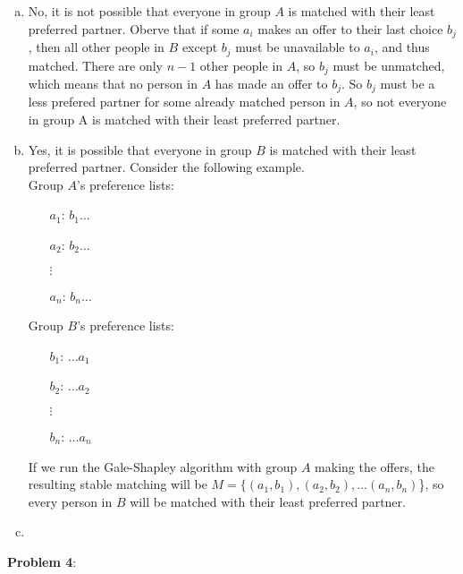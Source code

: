 \documentclass{article}
\begin{document}
\begin{enumerate}[a)]
    \item No, it is not possible that everyone in group $A$ is matched with their least preferred partner. Oberve that if some $a_i$ makes an offer to their last choice $b_j$, then all other people in $B$ except $b_j$ must be unavailable to $a_i$, and thus matched. 
    There are only $n - 1$ other people in $A$, so $b_j$ must be unmatched, which means that no person in $A$ has made an offer to $b_j$. So $b_j$ must be a less prefered partner for some already matched person in $A$, so not everyone in group A is matched with their least preferred partner. 
    \item Yes, it is possible that everyone in group $B$ is matched with their least preferred partner. Consider the following example. \\[0.5ex]
    Group $A$'s preference lists: 
    \begin{enumerate}
        \item[$a_1$:] $b_1 \dots $
        \item[$a_2$:] $b_2 \dots $
        \item[$\vdots$] 
        \item[$a_n$:] $b_n \dots $
    \end{enumerate} 
    Group $B$'s preference lists: 
    \begin{enumerate}
        \item[$b_1$:] $\dots a_1$
        \item[$b_2$:] $\dots a_2 $
        \item[$\vdots$] 
        \item[$b_n$:] $\dots a_n$
    \end{enumerate} 
    If we run the Gale-Shapley algorithm with group $A$ making the offers, the resulting stable matching will be $M = \{(a_1, b_1), (a_2, b_2), \dots (a_n, b_n)$\}, so every person in $B$ will be matched with their least preferred partner. 
    \item 
\end{enumerate}
\textbf{Problem 4}:
\end{document}
